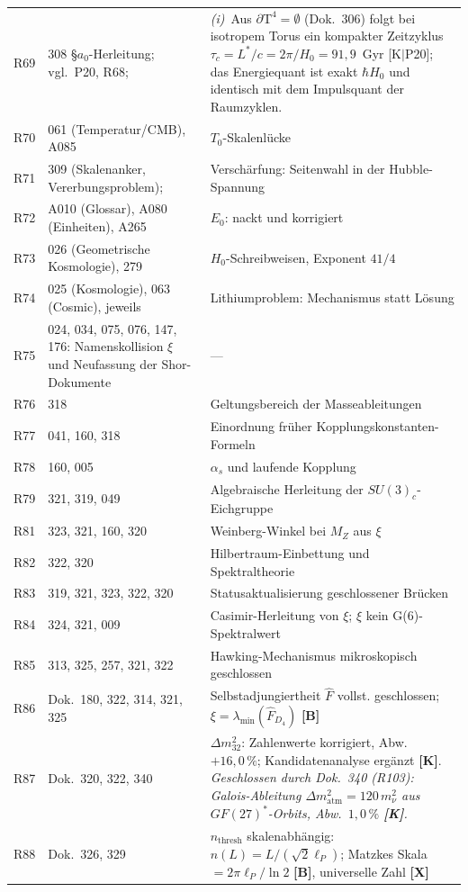 \begin{longtable}{@{}p{0.9cm}p{3.1cm}p{10.2cm}@{}}
R69 & 308 \S{}$a_0$-Herleitung; vgl.\ P20, R68; & \emph{(i)}~Aus $\partial\text{T}^4 = \emptyset$ (Dok.~306) folgt bei isotropem Torus ein kompakter Zeitzyklus $\tau_c = L^{*}/c = 2\pi/H_0 = 91{,}9$~Gyr [K$|$P20]; das Energiequant ist exakt $\hbar H_0$ und identisch mit dem Impulsquant der Raumzyklen. \\
R70 & 061 (Temperatur/CMB), A085 & $T_0$-Skalenlücke \\
R71 & 309 (Skalenanker, Vererbungsproblem); & Verschärfung: Seitenwahl in der
Hubble-Spannung \\
R72 & A010 (Glossar), A080 (Einheiten), A265 & $E_0$: nackt
und korrigiert \\
R73 & 026 (Geometrische Kosmologie), 279 & $H_0$-Schreibweisen, Exponent
$41/4$ \\
R74 & 025 (Kosmologie), 063 (Cosmic), jeweils & Lithiumproblem: Mechanismus
statt Lösung \\
R75 & 024, 034, 075, 076, 147, 176: Namenskollision $\xi$
und Neufassung der Shor-Dokumente & --- \\
R76 & 318 & Geltungsbereich der Masseableitungen \\
R77 & 041, 160, 318 & Einordnung früher Kopplungskonstanten-Formeln \\
R78 & 160, 005 & $\alpha_s$ und laufende Kopplung \\
R79 & 321, 319, 049 & Algebraische Herleitung der $SU(3)_c$-Eichgruppe \\
R81 & 323, 321, 160, 320 & Weinberg-Winkel bei $M_Z$ aus $\xi$ \\
R82 & 322, 320 & Hilbertraum-Einbettung und Spektraltheorie \\
R83 & 319, 321, 323, 322, 320 & Statusaktualisierung geschlossener Brücken \\
R84 & 324, 321, 009 & Casimir-Herleitung von $\xi$; $\xi$ kein G(6)-Spektralwert \\
R85 & 313, 325, 257, 321, 322 & Hawking-Mechanismus mikroskopisch geschlossen \\
R86 & Dok.~180, 322, 314, 321, 325 & Selbstadjungiertheit $\hat{F}$ vollst. geschlossen; $\xi = \lambda_{\min}(\hat{F}_{D_4})$ \textbf{[B]} \\
R87 & Dok.~320, 322, 340 & $\Delta m_{32}^2$: Zahlenwerte korrigiert, Abw.\ $+16{,}0\,\%$; Kandidatenanalyse ergänzt \textbf{[K]}. \emph{Geschlossen durch Dok.~340 (R103): Galois-Ableitung $\Delta m^2_\text{atm}=120\,m_\nu^2$ aus $GF(27)^*$-Orbits, Abw.\ $1{,}0\,\%$ \textbf{[K]}.} \\
R88 & Dok.~326, 329 & $n_{\mathrm{thresh}}$ skalenabhängig: $n(L)=L/(\sqrt{2}\ell_P)$; Matzkes Skala $=2\pi\ell_P/\ln 2$ \textbf{[B]}, universelle Zahl \textbf{[X]} \\

\end{longtable}
